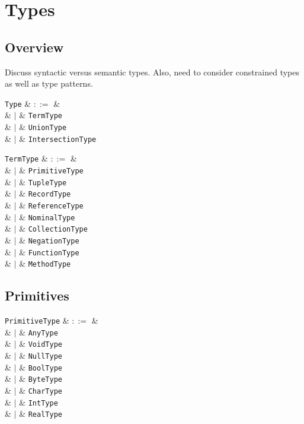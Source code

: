 \chapter{Types}
\section{Overview}
Discuss syntactic versus semantic types.  Also, need to consider
constrained types as well as type patterns.

\begin{syntax}
  \verb+Type+ & $::=$ & \\
  & $|$ & \verb+TermType+ \\
  & $|$ & \verb+UnionType+ \\
  & $|$ & \verb+IntersectionType+ \\
\end{syntax}

\begin{syntax}
  \verb+TermType+ & $::=$ & \\
  & $|$ & \verb+PrimitiveType+ \\
  & $|$ & \verb+TupleType+ \\
  & $|$ & \verb+RecordType+ \\
  & $|$ & \verb+ReferenceType+ \\
  & $|$ & \verb+NominalType+ \\
  & $|$ & \verb+CollectionType+ \\
  & $|$ & \verb+NegationType+ \\
  & $|$ & \verb+FunctionType+ \\
  & $|$ & \verb+MethodType+ \\
\end{syntax}


\section{Primitives}

\begin{syntax}
  \verb+PrimitiveType+ & $::=$ & \\
  & $|$ & \verb+AnyType+ \\
  & $|$ & \verb+VoidType+ \\
  & $|$ & \verb+NullType+ \\
  & $|$ & \verb+BoolType+ \\
  & $|$ & \verb+ByteType+ \\
  & $|$ & \verb+CharType+ \\
  & $|$ & \verb+IntType+ \\
  & $|$ & \verb+RealType+ \\
\end{syntax}


